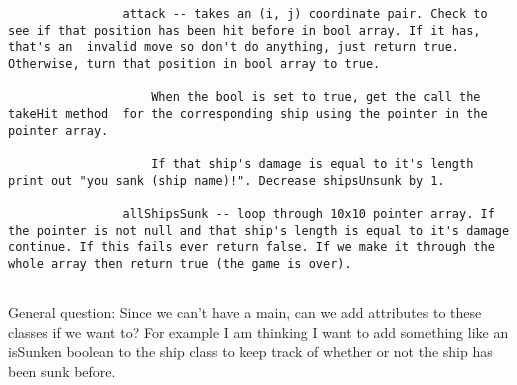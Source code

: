 \documentclass[a4paper, 11pt]{article}
\begin{document}
\begin{lstlisting}
				attack -- takes an (i, j) coordinate pair. Check to see if that position has been hit before in bool array. If it has, that's an  invalid move so don't do anything, just return true. Otherwise, turn that position in bool array to true.
					
					When the bool is set to true, get the call the takeHit method  for the corresponding ship using the pointer in the pointer array. 
					
					If that ship's damage is equal to it's length print out "you sank (ship name)!". Decrease shipsUnsunk by 1. 
						
				allShipsSunk -- loop through 10x10 pointer array. If the pointer is not null and that ship's length is equal to it's damage continue. If this fails ever return false. If we make it through the whole array then return true (the game is over).  
							
			\end{lstlisting}
			
			General question: Since we can't have a main, can we add attributes to these classes if we want to? For example I am thinking I want to add something like an isSunken boolean to the ship class to keep track of whether or not the ship has been sunk before. 
\end{document}

